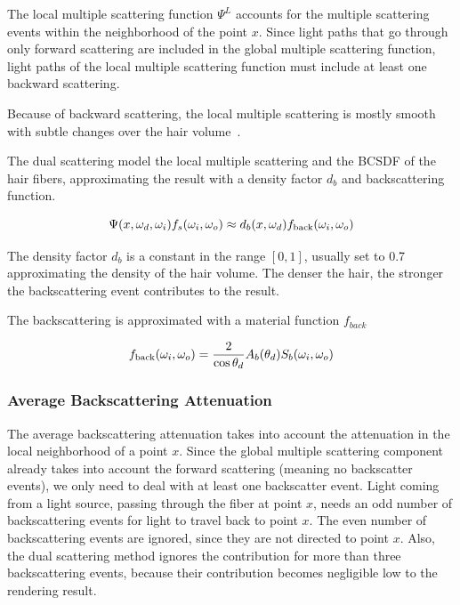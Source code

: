 The local multiple scattering function $\Psi^L$ accounts for the multiple scattering events within the neighborhood of the point $x$. Since light paths that go through only forward scattering are included in the global multiple scattering function, light paths of the local multiple scattering function must include at least one backward scattering.

Because of backward scattering, the local multiple scattering is mostly smooth with subtle changes over the hair volume~\cite{zinke}.

The dual scattering model the local multiple scattering and the BCSDF of the hair fibers, approximating the result with a density factor $d_b$ and backscattering function.

\begin{equation}
\Psi(x, \omega_d, \omega_i) f_s(\omega_i, \omega_o) \approx d_b(x, \omega_d) f_{\textnormal{back}}(\omega_i, \omega_o)
\end{equation}

The density factor $d_b$ is a constant in the range $[0, 1]$, usually set to 0.7 approximating the density of the hair volume. The denser the hair, the stronger the backscattering event contributes to the result.

The backscattering is approximated with a material function $f_{back}$

\begin{equation}
f_{\textnormal{back}}(\omega_i, \omega_o) = \frac{2}{\cos \theta_d}A_b(\theta_d) S_b(\omega_i, \omega_o)
\end{equation}

\subsubsection{Average Backscattering Attenuation}

The average backscattering attenuation takes into account the attenuation in the local neighborhood of a point $x$. Since the global multiple scattering component already takes into account the forward scattering (meaning no backscatter events), we only need to deal with at least one backscatter event. Light coming from a light source, passing through the fiber at point $x$, needs an odd number of backscattering events for light to travel back to point $x$. The even number of backscattering events are ignored, since they are not directed to point $x$. Also, the dual scattering method ignores the contribution for more than three backscattering events, because their contribution becomes negligible low to the rendering result. 


